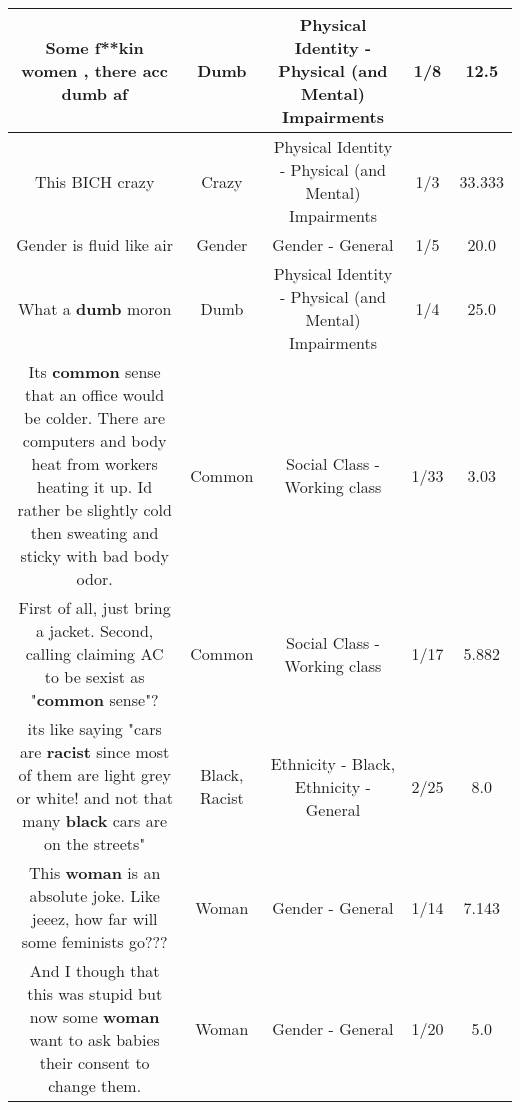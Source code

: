\documentclass[11pt]{article}
\newlength\mylength
\begin{document}
\begin{center}
\begin{longtable}{|C{.65\mylength}|C{.30\mylength}|C{.12\mylength}|C{.12\mylength}|C{.12\mylength}|}
  \small Some f**kin women , there acc \textbf{dumb} af\normalsize   & Dumb & Physical Identity - Physical (and Mental) Impairments & 1/8 & 12.5 \\  \hline
  \small This BICH crazy\normalsize   & Crazy & Physical Identity - Physical (and Mental) Impairments & 1/3 & 33.333 \\  \hline
  \small Gender is fluid like air\normalsize   & Gender & Gender - General & 1/5 & 20.0 \\  \hline
  \small What a \textbf{dumb} moron\normalsize   & Dumb & Physical Identity - Physical (and Mental) Impairments & 1/4 & 25.0 \\  \hline
  \small Its \textbf{common} sense that an office would be colder. There are computers and body heat from workers heating it up. Id rather be slightly cold then sweating and sticky with bad body odor.\normalsize   & Common & Social Class - Working class & 1/33 & 3.03 \\  \hline
  \small First of all, just bring a jacket. Second, calling claiming AC to be sexist as "\textbf{common} sense"?\normalsize   & Common & Social Class - Working class & 1/17 & 5.882 \\  \hline
  \small its like saying "cars are \textbf{racist} since most of them are light grey or white! and not that many \textbf{black} cars are on the streets"\normalsize   & Black, Racist & Ethnicity - Black, Ethnicity - General & 2/25 & 8.0 \\  \hline
  \small This \textbf{woman} is an absolute joke. Like jeeez, how far will some feminists go???\normalsize   & Woman & Gender - General & 1/14 & 7.143 \\  \hline
  \small And I though that this was stupid but now some \textbf{woman} want to ask babies their consent to change them.\normalsize   & Woman & Gender - General & 1/20 & 5.0 \\  \hline

\end{longtable}
\end{center}
\end{document}
